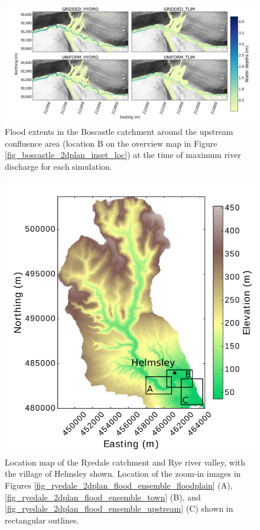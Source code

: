 \begin{figure}
\includegraphics[width=24cm]{chp_flood_figs_scripts/fig_boscastle_flood_enseble_confluence.png}
\caption{Flood extents in the Boscastle catchment around the upstream confluence area (location B on the overview map in Figure \ref{fig_boscastle_2dplan_inset_loc}) at the time of maximum river discharge for each simulation.}
\label{fig_boscastle_2dplan_flood_ensemble_confluence}
\end{figure}

\begin{figure}[!htbp]
\includegraphics[width=12cm]{chp_flood_figs_scripts/fig_ryedale_catchment_location_insets.png}
\caption{Location map of the Ryedale catchment and Rye river valley, with the village of Helmsley shown. Location of the zoom-in images in Figures \ref{fig_ryedale_2dplan_flood_ensemble_floodplain} (A), \ref{fig_ryedale_2dplan_flood_ensemble_town} (B), and \ref{fig_ryedale_2dplan_flood_ensemble_upstream} (C) shown in rectangular outlines.}
\label{fig_ryedale_2dplan_location_insets}
\end{figure}

